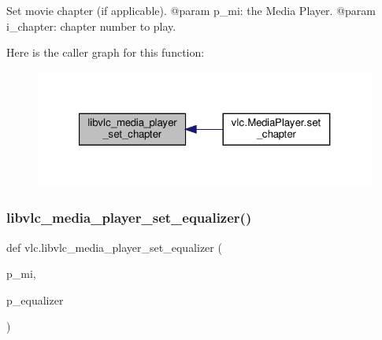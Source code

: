 \begin{DoxyVerb}Set movie chapter (if applicable).
@param p_mi: the Media Player.
@param i_chapter: chapter number to play.
\end{DoxyVerb}
 Here is the caller graph for this function\+:
\nopagebreak
\begin{figure}[H]
\begin{center}
\leavevmode
\includegraphics[width=321pt]{namespacevlc_a4ab44fdaf74a35fb2faa8fa6eb11a367_icgraph}
\end{center}
\end{figure}
\mbox{\label{namespacevlc_a236caf234257aa13be369f848074238f}} 
\subsubsection{\texorpdfstring{libvlc\+\_\+media\+\_\+player\+\_\+set\+\_\+equalizer()}{libvlc\_media\_player\_set\_equalizer()}}
{\footnotesize\ttfamily def vlc.\+libvlc\+\_\+media\+\_\+player\+\_\+set\+\_\+equalizer (\begin{DoxyParamCaption}\item[{}]{p\+\_\+mi,  }\item[{}]{p\+\_\+equalizer }\end{DoxyParamCaption})}

